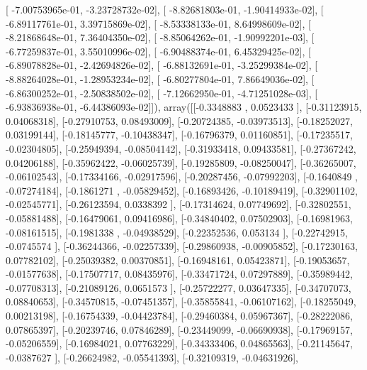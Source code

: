 \documentclass{article}
\begin{document}
       [ -7.00753965e-01,  -3.23728732e-02],
       [ -8.82681803e-01,  -1.90414933e-02],
       [ -6.89117761e-01,   3.39715869e-02],
       [ -8.53338133e-01,   8.64998609e-02],
       [ -8.21868648e-01,   7.36404350e-02],
       [ -8.85064262e-01,  -1.90992201e-03],
       [ -6.77259837e-01,   3.55010996e-02],
       [ -6.90488374e-01,   6.45329425e-02],
       [ -6.89078828e-01,  -2.42694826e-02],
       [ -6.88132691e-01,  -3.25299384e-02],
       [ -8.88264028e-01,  -1.28953234e-02],
       [ -6.80277804e-01,   7.86649036e-02],
       [ -6.86300252e-01,  -2.50838502e-02],
       [ -7.12662950e-01,  -4.71251028e-03],
       [ -6.93836938e-01,  -6.44386093e-02]]), array([[-0.3348883 ,  0.0523433 ],
       [-0.31123915,  0.04068318],
       [-0.27910753,  0.08493009],
       [-0.20724385, -0.03973513],
       [-0.18252027,  0.03199144],
       [-0.18145777, -0.10438347],
       [-0.16796379,  0.01160851],
       [-0.17235517, -0.02304805],
       [-0.25949394, -0.08504142],
       [-0.31933418,  0.09433581],
       [-0.27367242,  0.04206188],
       [-0.35962422, -0.06025739],
       [-0.19285809, -0.08250047],
       [-0.36265007, -0.06102543],
       [-0.17334166, -0.02917596],
       [-0.20287456, -0.07992203],
       [-0.1640849 , -0.07274184],
       [-0.1861271 , -0.05829452],
       [-0.16893426, -0.10189419],
       [-0.32901102, -0.02545771],
       [-0.26123594,  0.0338392 ],
       [-0.17314624,  0.07749692],
       [-0.32802551, -0.05881488],
       [-0.16479061,  0.09416986],
       [-0.34840402,  0.07502903],
       [-0.16981963, -0.08161515],
       [-0.1981338 , -0.04938529],
       [-0.22352536,  0.053134  ],
       [-0.22742915, -0.0745574 ],
       [-0.36244366, -0.02257339],
       [-0.29860938, -0.00905852],
       [-0.17230163,  0.07782102],
       [-0.25039382,  0.00370851],
       [-0.16948161,  0.05423871],
       [-0.19053657, -0.01577638],
       [-0.17507717,  0.08435976],
       [-0.33471724,  0.07297889],
       [-0.35989442, -0.07708313],
       [-0.21089126,  0.0651573 ],
       [-0.25722277,  0.03647335],
       [-0.34707073,  0.08840653],
       [-0.34570815, -0.07451357],
       [-0.35855841, -0.06107162],
       [-0.18255049,  0.00213198],
       [-0.16754339, -0.04423784],
       [-0.29460384,  0.05967367],
       [-0.28222086,  0.07865397],
       [-0.20239746,  0.07846289],
       [-0.23449099, -0.06690938],
       [-0.17969157, -0.05206559],
       [-0.16984021,  0.07763229],
       [-0.34333406,  0.04865563],
       [-0.21145647, -0.0387627 ],
       [-0.26624982, -0.05541393],
       [-0.32109319, -0.04631926],
\end{document}
